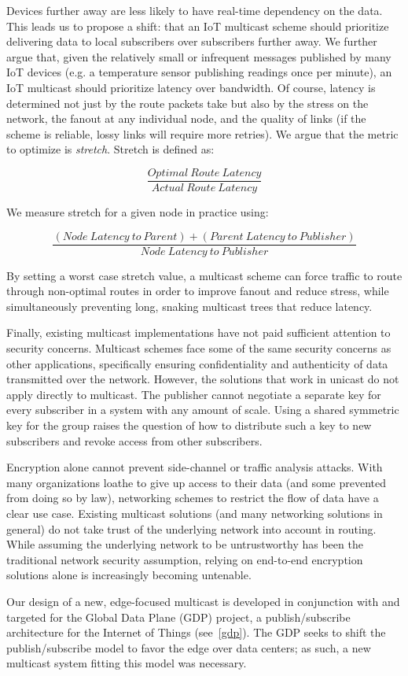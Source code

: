 Devices further away are less likely to have real-time dependency on the data. This leads us to propose a shift: that an IoT multicast scheme should prioritize delivering data to local subscribers over subscribers further away. We further argue that, given the relatively small or infrequent messages published by many IoT devices (e.g. a temperature sensor publishing readings once per minute), an IoT multicast should prioritize latency over bandwidth. Of course, latency is determined not just by the route packets take but also by the stress on the network, the fanout at any individual node, and the quality of links (if the scheme is reliable, lossy links will require more retries). We argue that the metric to optimize is \textit{stretch}. Stretch is defined as:

\[\frac{Optimal\: Route\: Latency}{Actual\: Route\: Latency}\]

We measure stretch for a given node in practice using:

\[\frac{(Node\: Latency\: to\: Parent) + (Parent\: Latency\: to\: Publisher)}{Node\: Latency\: to\: Publisher}\]

By setting a worst case stretch value, a multicast scheme can force traffic to route through non-optimal routes in order to improve fanout and reduce stress, while simultaneously preventing long, snaking multicast trees that reduce latency.

Finally, existing multicast implementations have not paid sufficient attention to security concerns. Multicast schemes face some of the same security concerns as other applications, specifically ensuring confidentiality and authenticity of data transmitted over the network. However, the solutions that work in unicast do not apply directly to multicast. The publisher cannot negotiate a separate key for every subscriber in a system with any amount of scale.  Using a shared symmetric key for the group raises the question of how to distribute such a key to new subscribers and revoke access from other subscribers. 

Encryption alone cannot prevent side-channel or traffic analysis attacks. With many organizations loathe to give up access to their data (and some prevented from doing so by law), networking schemes to restrict the flow of data have a clear use case. Existing multicast solutions (and many networking solutions in general) do not take trust of the underlying network into account in routing. While assuming the underlying network to be untrustworthy has been the traditional network security assumption, relying on end-to-end encryption solutions alone is increasingly becoming untenable.

Our design of a new, edge-focused multicast is developed in conjunction with and targeted for the Global Data Plane (GDP) project, a publish/subscribe architecture for the Internet of Things (see~\autoref{gdp}). The GDP seeks to shift the publish/subscribe model to favor the edge over data centers; as such, a new multicast system fitting this model was necessary.


